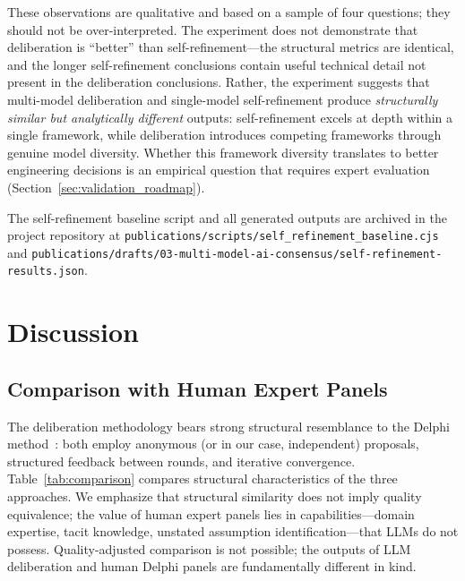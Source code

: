 \documentclass[11pt,a4paper]{article}
\begin{document}
These observations are qualitative and based on a sample of four questions; they should not be over-interpreted. The experiment does not demonstrate that deliberation is ``better'' than self-refinement---the structural metrics are identical, and the longer self-refinement conclusions contain useful technical detail not present in the deliberation conclusions. Rather, the experiment suggests that multi-model deliberation and single-model self-refinement produce \emph{structurally similar but analytically different} outputs: self-refinement excels at depth within a single framework, while deliberation introduces competing frameworks through genuine model diversity. Whether this framework diversity translates to better engineering decisions is an empirical question that requires expert evaluation (Section~\ref{sec:validation_roadmap}).

The self-refinement baseline script and all generated outputs are archived in the project repository at \texttt{publications/scripts/self\_refinement\_baseline.cjs} and \texttt{publications/drafts/03-multi-model-ai-consensus/self-refinement-results.json}.

\section{Discussion}
\label{sec:discussion}

\subsection{Comparison with Human Expert Panels}

The deliberation methodology bears strong structural resemblance to the Delphi method~\cite{linstone1975delphi}: both employ anonymous (or in our case, independent) proposals, structured feedback between rounds, and iterative convergence. Table~\ref{tab:comparison} compares structural characteristics of the three approaches. We emphasize that structural similarity does not imply quality equivalence; the value of human expert panels lies in capabilities---domain expertise, tacit knowledge, unstated assumption identification---that LLMs do not possess. Quality-adjusted comparison is not possible; the outputs of LLM deliberation and human Delphi panels are fundamentally different in kind.
\end{document}
